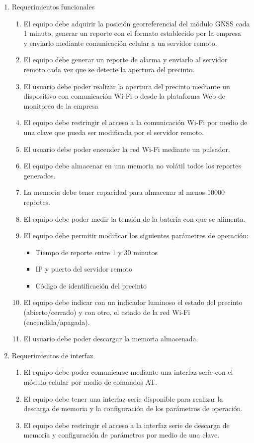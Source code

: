 \documentclass[
11pt, %
]{charter}
\begin{document}
\begin{enumerate}
	\item Requerimientos funcionales
		\begin{enumerate}
			\item El equipo debe adquirir la posición georreferencial del módulo GNSS cada 1 minuto, generar un reporte con el formato establecido por la empresa \empclientename\, y enviarlo mediante comunicación celular a un servidor remoto.
			\item El equipo debe generar un reporte de alarma y enviarlo al servidor remoto cada vez que se detecte la apertura del precinto.
			\item El usuario debe poder realizar la apertura del precinto mediante un dispositivo con comunicación Wi-Fi o desde la plataforma Web de monitoreo de la empresa \empclientename
			\item El equipo debe restringir el acceso a la comunicación Wi-Fi por medio de una clave que pueda ser modificada por el servidor remoto.
			\item El usuario debe poder encender la red Wi-Fi mediante un pulsador.
			\item El equipo debe almacenar en una memoria no volátil todos los reportes generados.
			\item La memoria debe tener capacidad para almacenar al menos 10000 reportes. 
			\item El equipo debe poder medir la tensión de la batería con que se alimenta.
			\item El equipo debe permitir modificar los siguientes parámetros de operación:
			\begin{itemize}
				\item Tiempo de reporte entre 1 y 30 minutos
				\item IP y puerto del servidor remoto
				\item Código de identificación del precinto
			\end{itemize}
			\item El equipo debe indicar con un indicador luminoso el estado del precinto (abierto/cerrado) y con otro, el estado de la red Wi-Fi (encendida/apagada).			
			\item El usuario debe poder descargar la memoria almacenada.
		\end{enumerate}
	\item Requerimientos de interfaz
		\begin{enumerate}
			\item El equipo debe poder comunicarse mediante una interfaz serie con el módulo celular por medio de comandos AT.
			\item El equipo debe tener una interfaz serie disponible para realizar la descarga de memoria y la configuración de los parámetros de operación.
			\item El equipo debe restringir el acceso a la interfaz serie de descarga de memoria y configuración de parámetros por medio de una clave.
		\end{enumerate}		
\end{enumerate}
\end{document}
